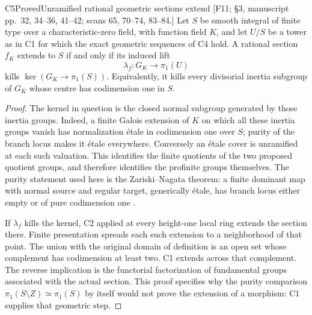 \begin{result}{C5}{Proved}{Unramified rational geometric sections extend}
\textup{[F11; \S3, manuscript pp.\ 32, 34--36, 41--42; scans 65,
70--74, 83--84.]}
Let $S$ be smooth integral of finite type over a characteristic-zero
field, with function field $K$, and let $U/S$ be a tower as in C1 for
which the exact geometric sequences of C4 hold. A rational section
$f_K$ extends to $S$ if and only if its induced lift
\[
 \lambda_f:G_K\longrightarrow\pi_1(U)
\]
kills $\ker(G_K\to\pi_1(S))$. Equivalently, it kills every divisorial
inertia subgroup of $G_K$ whose centre has codimension one in $S$.
\end{result}

\begin{proof}
The kernel in question is the closed normal subgroup generated by those
inertia groups. Indeed, a finite Galois extension of $K$ on which all
these inertia groups vanish has normalization \'etale in codimension
one over $S$; purity of the branch locus makes it \'etale everywhere.
Conversely an \'etale cover is unramified at each such valuation. This
identifies the finite quotients of the two proposed quotient groups,
and therefore identifies the profinite groups themselves. The purity
statement used here is the Zariski--Nagata theorem: a finite dominant
map with normal source and regular target, generically \'etale, has
branch locus either empty or of pure codimension one
\cite{CF_StacksPurity}.

If $\lambda_f$ kills the kernel, C2 applied at every height-one local
ring extends the section there. Finite presentation spreads each such
extension to a neighborhood of that point. The union with the original
domain of definition is an open set whose complement has codimension
at least two. C1 extends across that complement. The reverse implication
is the functorial factorization of fundamental groups associated with
the actual section. This proof specifies why the purity comparison
$\pi_1(S\setminus Z)\simeq\pi_1(S)$ by itself would not prove the
extension of a morphism: C1 supplies that geometric step.
\end{proof}

